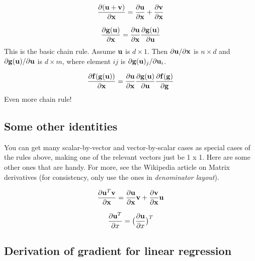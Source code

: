  \begin{equation}
    \frac{\partial ({\bf u} + {\bf v})}{\partial {\bf x}} = \frac{\partial
      {\bf u}}{\partial {\bf x}} + \frac{\partial {\bf v}}{\partial {\bf x}}
    \label{eq:uplusv}
  \end{equation}

\begin{equation}\frac{\partial {\bf g}({\bf u})}{\partial {\bf x}} = \frac{\partial
      {\bf u}}{\partial {\bf x}}\frac{\partial {\bf g}({\bf u})}{\partial
      {\bf u}}\end{equation}
  This is the basic chain rule.  Assume ${\bf u}$ is $d \times 1$.  Then
  $\partial {\bf u} / \partial {\bf x}$ is $n \times d$ and $\partial {\bf g}({\bf u})
  / \partial {\bf u}$ is $d \times m$, where element $ij$ is $\partial
  {\bf g}({\bf u})_j / \partial {\bf u}_i$.

\begin{equation}\frac{\partial {\bf f}({\bf g}({\bf u}))}{\partial {\bf x}} = \frac{\partial
      {\bf u}}{\partial {\bf x}}\frac{\partial {\bf g}({\bf u})}{\partial {\bf u}}
    \frac{\partial {\bf f}({\bf g})}{\partial {\bf g}}\end{equation}
  Even more chain rule!

  \subsection{Some other identities}
  You can get many scalar-by-vector and vector-by-scalar cases as special
  cases of the rules above, making one of the relevant vectors just be
  1 x 1.  Here are some other ones that are handy.  For more, see the
  Wikipedia article on Matrix derivatives (for consistency, only use
  the ones in {\em denominator layout}).

  \begin{equation}
    \frac{\partial {\bf u}^T {\bf v}}{\partial {\bf x}} = \frac{\partial
      {\bf u}}{\partial {\bf x}} {\bf v} + \frac{\partial {\bf v}}{\partial {\bf x}} {\bf u}
    \label{eq:uTv}
    \end{equation}

  \begin{equation}
    \frac{\partial {\bf u}^T}{\partial x} = \big(\frac{\partial
      {\bf u}}{\partial x}\big)^T
    \label{eq:uT}
    \end{equation}
    


    \subsection{Derivation of gradient for linear regression}

